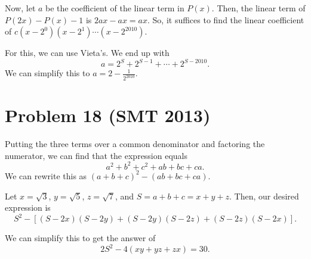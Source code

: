 \documentclass{scrartcl}
\begin{document}
Now, let $a$ be the coefficient of the linear term in $P(x)$. Then, the linear term of $P(2x) - P(x) - 1$ is $2ax - ax = ax$. So, it suffices to find the linear coefficient of $c(x - 2^0)(x - 2^1)\cdots(x - 2^{2010})$.

For this, we can use Vieta's. We end up with
\[
    a = 2^S + 2^{S-1} + \cdots + 2^{S - 2010}.
\]
We can simplify this to $a = 2 - \frac{1}{2^{2010}}.$
\section*{Problem 18 (SMT 2013)}
Putting the three terms over a common denominator and factoring the numerator, we can find that the expression equals
\[
    a^2 + b^2 + c^2 + ab + bc + ca.
\]
We can rewrite this as $(a + b + c)^2 - (ab + bc + ca)$.

Let $x = \sqrt{3}$, $y = \sqrt{5}$, $z = \sqrt{7}$, and $S = a + b + c = x + y + z$. Then, our desired expression is
\[
    S^2 - [(S - 2x)(S - 2y) + (S - 2y)(S - 2z) + (S - 2z)(S - 2x)].
\]

We can simplify this to get the answer of
\[
    2S^2 - 4(xy + yz + zx) = 30.
\]
\end{document}
